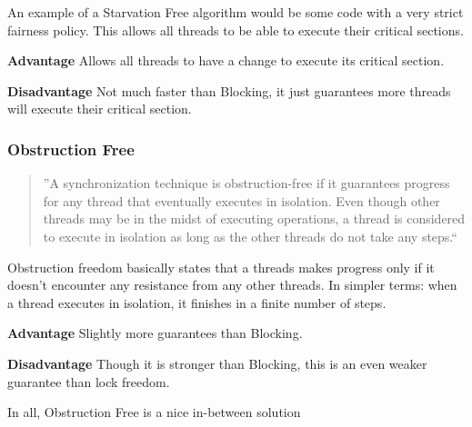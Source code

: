 \documentclass[letterpaper, 12pt]{article}
\begin{document}
An example of a Starvation Free algorithm would be some code with a very strict fairness 
policy. This allows all threads to be able to execute their critical sections.
\par\vspace{\baselineskip}

{\bfseries Advantage}\newline
Allows all threads to have a change to execute its critical section.
\par\vspace{\baselineskip}

{\bfseries Disadvantage}\newline
Not much faster than Blocking, it just guarantees more threads will execute their critical section.

\subsubsection{Obstruction Free}

\begin{quotation}
''A synchronization technique is obstruction-free if it  guarantees progress for any 
thread that  eventually executes  in  isolation. Even  though other  threads  may  be  
in the  midst  of  executing operations,  a  thread  is  considered to execute in 
isolation as long as the other threads do not take any steps.`` \citep{obsfree}
\end{quotation}

Obstruction freedom basically states that a threads makes progress only if it doesn't encounter 
any resistance from any other threads. In simpler terms: when a thread executes in isolation, 
it finishes in a finite number of steps\citep{artofmulti}.

\par\vspace{\baselineskip}
{\bfseries Advantage}\newline
Slightly more guarantees than Blocking.
\par\vspace{\baselineskip}

{\bfseries Disadvantage}\newline
Though it is stronger than Blocking, this is an even weaker guarantee than lock freedom.

\par\vspace{\baselineskip}
In all, Obstruction Free is a nice in-between solution
\end{document}
